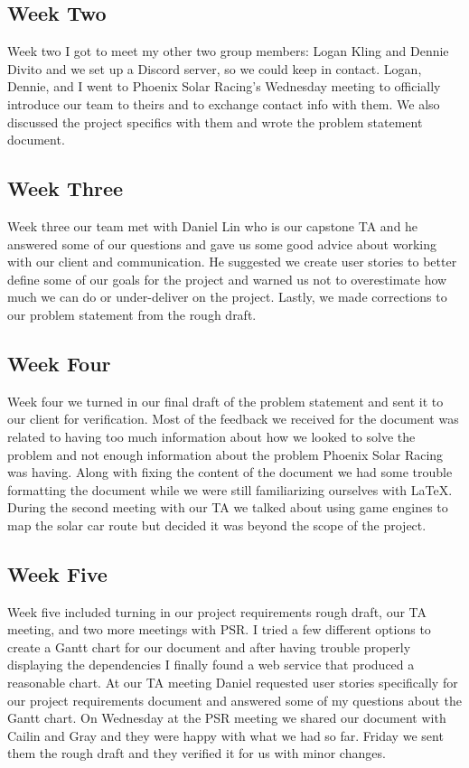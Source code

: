 \begin{singlespace}
\subsection{Week Two}
Week two I got to meet my other two group members: Logan Kling and Dennie Divito and we set up a Discord server, so we could keep in contact. 
Logan, Dennie, and I went to Phoenix Solar Racing’s Wednesday meeting to officially introduce our team to theirs and to exchange contact info with them. 
We also discussed the project specifics with them and wrote the problem statement document.

\subsection{Week Three}
Week three our team met with Daniel Lin who is our capstone TA and he answered some of our questions and gave us some good advice about working with our client and communication. 
He suggested we create user stories to better define some of our goals for the project and warned us not to overestimate how much we can do or under-deliver on the project. Lastly, we made corrections to our problem statement from the rough draft.

\subsection{Week Four}
Week four we turned in our final draft of the problem statement and sent it to our client for verification. 
Most of the feedback we received for the document was related to having too much information about how we looked to solve the problem and not enough information about the problem Phoenix Solar Racing was having. 
Along with fixing the content of the document we had some trouble formatting the document while we were still familiarizing ourselves with \LaTeX. 
During the second meeting with our TA we talked about using game engines to map the solar car route but decided it was beyond the scope of the project.

\subsection{Week Five}
Week five included turning in our project requirements rough draft, our TA meeting, and two more meetings with PSR. 
I tried a few different options to create a Gantt chart for our document and after having trouble properly displaying the dependencies I finally found a web service that produced a reasonable chart. 
At our TA meeting Daniel requested user stories specifically for our project requirements document and answered some of my questions about the Gantt chart. 
On Wednesday at the PSR meeting we shared our document with Cailin and Gray and they were happy with what we had so far. 
Friday we sent them the rough draft and they verified it for us with minor changes.


\end{singlespace}
